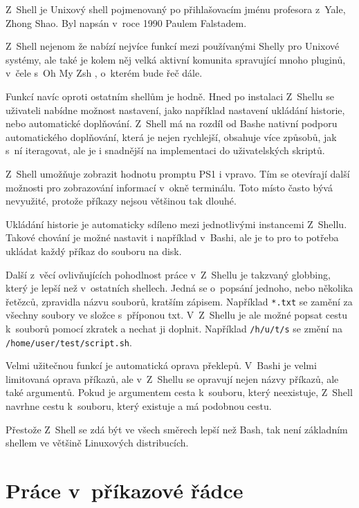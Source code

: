 \documentclass[thesis=M,czech]{FITthesis}[2012/06/26]
\begin{document}
Z~Shell \cite{zsh} je Unixový shell pojmenovaný po přihlašovacím jménu profesora z~Yale, Zhong Shao. Byl napsán v~roce 1990 Paulem Falstadem.

Z~Shell nejenom že nabízí nejvíce funkcí mezi používanými Shelly pro Unixové systémy, ale také je kolem něj velká aktivní komunita spravující mnoho pluginů, v~čele s~Oh My Zsh \cite{ohmyzsh}, o~kterém bude řeč dále.

Funkcí navíc oproti ostatním shellům je hodně. Hned po instalaci Z~Shellu se uživateli nabídne možnost nastavení, jako například nastavení ukládání historie, nebo automatické doplňování. Z~Shell má na rozdíl od Bashe nativní podporu automatického doplňování, která je nejen rychlejší, obsahuje více způsobů, jak s~ní iteragovat, ale je i snadnější na implementaci do uživatelských skriptů.

Z~Shell umožňuje zobrazit hodnotu promptu PS1 i vpravo. Tím se otevírají další možnosti pro zobrazování informací v~okně terminálu. Toto místo často bývá nevyužité, protože příkazy nejsou většinou tak dlouhé.

Ukládání historie je automaticky sdíleno mezi jednotlivými instancemi Z~Shellu. Takové chování je možné nastavit i například v~Bashi, ale je to pro to potřeba ukládat každý příkaz do souboru na disk.

Další z~věcí ovlivňujících pohodlnost práce v~Z~Shellu je takzvaný globbing, který je lepší než v~ostatních shellech. Jedná se o~popsání jednoho, nebo několika řetězců, zpravidla názvu souborů, kratším zápisem. Například \texttt{*.txt} se zamění za všechny soubory ve složce s~příponou txt. V~Z~Shellu je ale možné popsat cestu k~souborů pomocí zkratek a nechat ji doplnit. Například \texttt{/h/u/t/s} se změní na \texttt{/home/user/test/script.sh}.

Velmi užitečnou funkcí je automatická oprava překlepů. V~Bashi je velmi limitovaná oprava příkazů, ale v~Z~Shellu se opravují nejen názvy příkazů, ale také argumentů. Pokud je argumentem cesta k~souboru, který neexistuje, Z~Shell navrhne cestu k~souboru, který existuje a má podobnou cestu.

Přestože Z~Shell se zdá být ve všech směrech lepší než Bash, tak není základním shellem ve většině Linuxových distribucích.


%
%
%
\section{Práce v~příkazové řádce}
\end{document}

